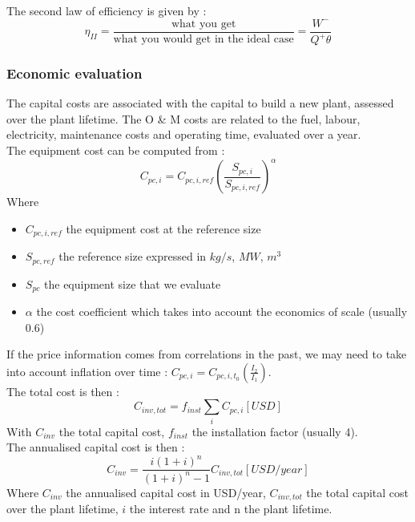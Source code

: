 \documentclass[../main.tex]{subfiles}
\begin{document}
The second law of efficiency is given by : \begin{equation}
    \eta_{II} = \frac{\text{what you get}}{\text{what you would get in the ideal case}} = \frac{W^-}{Q^+ \theta}
\end{equation}

\subsubsection{Economic evaluation}
The capital costs are associated with the capital to build a new plant, assessed over the plant lifetime. The O \& M costs are related to the fuel, labour, electricity, maintenance costs and operating time, evaluated over a year. \\

The equipment cost can be computed from : \begin{equation}
    C_{pc,i} = C_{pc,i, ref} (\frac{S_{pc,i}}{S_{pc,i,ref}})^\alpha
\end{equation}
Where \begin{itemize}
    \item $C_{pc,i,ref}$ the equipment cost at the reference size
    \item $S_{pc,ref}$ the reference size expressed in $kg/s$, $MW$, $m^3$
    \item $S_{pc}$ the equipment size that we evaluate
    \item $\alpha$ the cost coefficient which takes into account the economics of scale (usually 0.6)
\end{itemize}

If the price information comes from correlations in the past, we may need to take into account inflation over time : $C_{pc,i} = C_{pc, i, t_0} (\frac{I_2}{I_1})$.\\

The total cost is then : \begin{equation}
    C_{inv, tot} = f_{inst} \sum_i C_{pc,i} [USD]
\end{equation}
With $C_{inv}$ the total capital cost, $f_{inst}$ the installation factor (usually 4).\\

The annualised capital cost is then : \begin{equation}
    C_{inv} = \frac{i(1+i)^n}{(1+i)^n-1} C_{inv,tot} [USD/year]
\end{equation}
Where $C_{inv}$ the annualised capital cost in USD/year, $C_{inv,tot}$ the total capital cost over the plant lifetime, $i$ the interest rate and n the plant lifetime.\\
\end{document}

